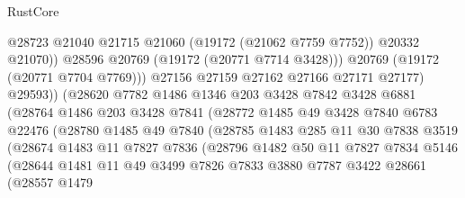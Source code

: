 \begin{lexlean}{RustCore}
\begin{coremodule}
                                @28723
                                @21040
                                @21715
                                @21060
                                (@19172 (@21062 @7759 @7752))
                                @20332
                                @21070))
                            @28596
                            @20769
                            (@19172 (@20771 @7714 @3428)))
                          @20769
                          (@19172 (@20771 @7704 @7769)))
                        @27156
                        @27159
                        @27162
                        @27166
                        @27171
                        @27177)
                      @29593))
                  (@28620
                    @7782
                    @1486
                    @1346
                    @203
                    @3428
                    @7842
                    @3428
                    @6881
                    (@28764
                      @1486
                      @203
                      @3428
                      @7841
                      (@28772
                        @1485
                        @49
                        @3428
                        @7840
                        @6783
                        @22476
                        (@28780
                          @1485
                          @49
                          @7840
                          (@28785
                            @1483
                            @285
                            @11
                            @30
                            @7838
                            @3519
                            (@28674
                              @1483
                              @11
                              @7827
                              @7836
                              (@28796
                                @1482
                                @50
                                @11
                                @7827
                                @7834
                                @5146
                                (@28644
                                  @1481
                                  @11
                                  @49
                                  @3499
                                  @7826
                                  @7833
                                  @3880
                                  @7787
                                  @3422
                                  @28661
                                  (@28557
                                    @1479

\end{coremodule}
\end{lexlean}
